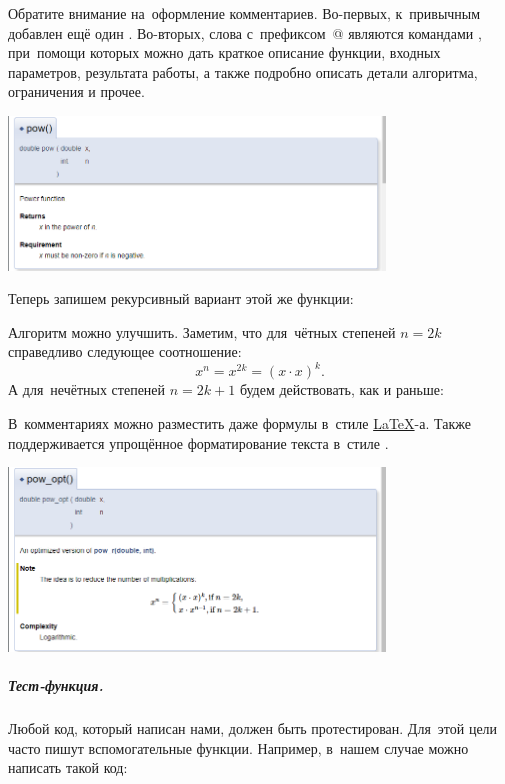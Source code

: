 Обратите внимание на~оформление комментариев. Во-первых, к~привычным \code{//} добавлен ещё один \code{/}. Во-вторых, слова с~префиксом~@ являются командами , при~помощи которых можно дать краткое описание функции, входных параметров, результата работы, а также подробно описать детали алгоритма, ограничения и прочее.

\begin{center}
  \includegraphics[width=0.75\textwidth]{images/doxygen_pow_description.png}
\end{center}

Теперь запишем рекурсивный вариант этой же функции:

Алгоритм можно улучшить. Заметим, что для~чётных степеней \(n = 2k\) справедливо следующее соотношение:
\[
  x^n = x^{2k} = (x\cdot x)^k.
\]
А для~нечётных степеней \(n = 2k + 1\) будем действовать, как и раньше:

В~комментариях можно разместить даже формулы в~стиле \href{\latexurl}{\LaTeX}-а. Также поддерживается упрощённое форматирование текста в~стиле \href{https://ru.wikipedia.org/wiki/Markdown}{}.

\begin{center}
  \includegraphics[width=0.75\textwidth]{images/doxygen_pow_opt_description.png}
\end{center}



\subparagraph{Тест-функция.}
Любой код, который написан нами, должен быть протестирован. Для~этой цели часто пишут вспомогательные функции. Например, в~нашем случае можно написать такой код:


